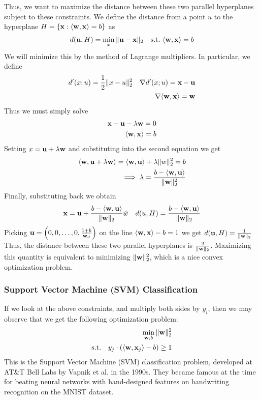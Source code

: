         Thus, we want to maximize the distance between these two parallel
        hyperplanes subject to these constraints. We define the distance from a point $u$ to the hyperplane
        $H = \{ \mathbf{x}: \langle \mathbf{w}, \mathbf{x} \rangle = b \}$ as 
        \begin{align*}
            d({\bf u}, H) = \min_x \, \lVert {\bf u} - \mathbf{x} \rVert_2 \quad \text{s.t.} \  \langle \mathbf{w}, \mathbf{x} \rangle = b
        \end{align*}
        We will minimize this by the method of Lagrange multipliers. In particular, we define
        \begin{align*}
            d'(x; u) = \frac{1}{2} \lVert x-u \rVert_2^2 \quad \nabla d'(x; u) = \mathbf{x} - {\bf u} \\
            \nabla \langle \mathbf{w}, \mathbf{x} \rangle = \mathbf{w} \\
        \end{align*}
        Thus we must simply solve
        \begin{align*}
            \mathbf{x} - {\bf u} - \lambda \mathbf{w} = 0 \\
            \langle \mathbf{w}, \mathbf{x} \rangle = b
        \end{align*}
        Setting $x = {\bf u} + \lambda \mathbf{w}$ and substituting into the second equation we get
        \begin{align*}
            \langle \mathbf{w}, {\bf u} + \lambda \mathbf{w} \rangle = \langle \mathbf{w}, {\bf u} \rangle + \lambda \lVert w \rVert_2^2 = b \\
            \implies \lambda = \frac{b - \langle \mathbf{w}, {\bf u} \rangle}{\lVert \mathbf{w} \rVert_2^2}
        \end{align*}
        Finally, substituting back we obtain
        \begin{align*}
            \mathbf{x} = {\bf u} + \frac{b - \langle \mathbf{w}, {\bf u} \rangle}{\lVert \mathbf{w} \rVert_2} \hat{w} \quad d(u, H) = \frac{b - \langle \mathbf{w}, {\bf u} \rangle}{\lVert \mathbf{w} \rVert_2}
        \end{align*}
        Picking $\mathbf{u} = \left( 0, 0, \dots, 0, \frac{1 + b}{\mathbf{w}_d} \right)$ on the line $\langle \mathbf{w},\mathbf{x} \rangle - b = 1$ we get
        $d(\mathbf{u}, H) = \frac{1}{\lVert \mathbf{w} \rVert_2}$
        Thus, the distance between these two parallel hyperplanes is $\frac{2}{\lVert \mathbf{w} \rVert_2}$. Maximizing
        this quantity is equivalent to minimizing $\lVert \mathbf{w} \rVert^2_2$, which is a nice convex optimization
        problem. 

        \subsubsection{Support Vector Machine (SVM) Classification}
        If we look at the above constraints, and multiply both sides by $y_i$, then
        we may observe that we get the following optimization problem:
        \begin{align*}
            \min_{\mathbf{w}, b} \, \lVert \mathbf{w} \rVert_2^2 \\
            \text{s.t.} \quad y_j \cdot \left( \langle \mathbf{w}, \mathbf{x}_j \rangle - b \right) \geq 1
        \end{align*}
        This is the Support Vector Machine (SVM) classification problem, developed at AT\&T Bell Labs by Vapnik et al. \cite{boser1992training} in the 1990s.
        They became famous at the time for beating neural networks with hand-designed features on handwriting recognition on the MNIST dataset.

